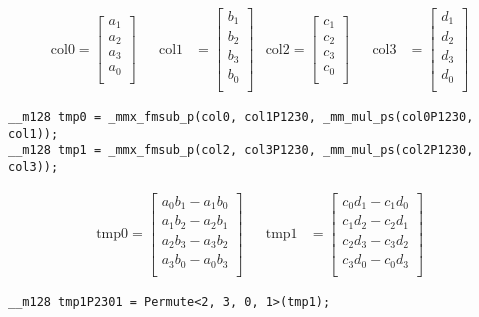 \documentclass[]{scrartcl}
\begin{document}
\begin{align*}
\mathrm{col0} 
=
\begin{bmatrix}
a_1\\
a_2\\
a_3\\
a_0\\
\end{bmatrix}
&&
\mathrm{col1} 
&=
\begin{bmatrix}
b_1\\
b_2\\
b_3\\
b_0\\
\end{bmatrix}
&
\mathrm{col2} 
=
\begin{bmatrix}
c_1\\
c_2\\
c_3\\
c_0\\
\end{bmatrix}
&&
\mathrm{col3} 
&=
\begin{bmatrix}
d_1\\
d_2\\
d_3\\
d_0\\
\end{bmatrix}
\end{align*}

\begin{verbatim}
__m128 tmp0 = _mmx_fmsub_p(col0, col1P1230, _mm_mul_ps(col0P1230, col1));
__m128 tmp1 = _mmx_fmsub_p(col2, col3P1230, _mm_mul_ps(col2P1230, col3));
\end{verbatim}


\begin{align*}
\mathrm{tmp0} 
=
\begin{bmatrix}
a_0b_1 - a_1b_0\\
a_1b_2 - a_2b_1\\
a_2b_3 - a_3b_2\\
a_3b_0 - a_0b_3\\
\end{bmatrix}
&&
\mathrm{tmp1} 
&=
\begin{bmatrix}
c_0d_1 - c_1d_0\\
c_1d_2 - c_2d_1\\
c_2d_3 - c_3d_2\\
c_3d_0 - c_0d_3\\
\end{bmatrix}
\end{align*}

\begin{verbatim}
__m128 tmp1P2301 = Permute<2, 3, 0, 1>(tmp1);
\end{verbatim}
\end{document}
